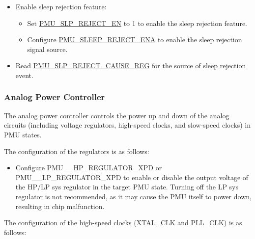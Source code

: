 \documentclass[main\_\_EN.tex]{subfiles}
\begin{document}
\begin{itemize}
    \item Enable sleep rejection feature:
    \begin{itemize}
        \item Set \hyperref[fielddesc:PMUSLPREJECTEN]{PMU\_SLP\_REJECT\_EN} to 1 to enable the sleep rejection feature.
        \item Configure \hyperref[fielddesc:PMUSLEEPREJECTENA]{PMU\_SLEEP\_REJECT\_ENA} to enable the sleep rejection signal source.
    \end{itemize}
    \item Read \hyperref[fielddesc:PMUREJECTCAUSE]{PMU\_SLP\_REJECT\_CAUSE\_REG} for the source of sleep rejection event.
\end{itemize}

\subsubsection{Analog Power Controller}\label{sec:lowpowm_analog_power_controller}

The analog power controller controls the power up and down of the analog circuits (including voltage regulators, high-speed clocks, and slow-speed clocks) in PMU states.

The configuration of the regulators is as follows:

\begin{itemize}
    \item Configure PMU\_\_HP\_REGULATOR\_XPD or PMU\_\_LP\_REGULATOR\_XPD to enable or disable the output voltage of the HP/LP sys regulator in the target PMU state. Turning off the LP sys regulator is not recommended, as it may cause the PMU itself to power down, resulting in chip malfunction.
\end{itemize}

The configuration of the high-speed clocks (XTAL\_CLK and PLL\_CLK) is as follows:
\end{document}
